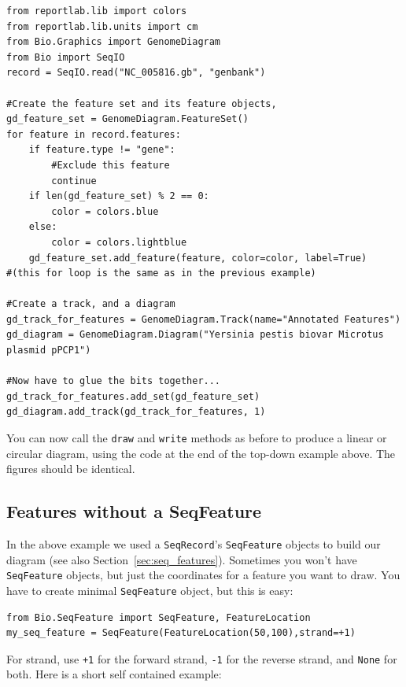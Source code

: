 \documentclass{report}
\begin{document}
\begin{verbatim}
from reportlab.lib import colors
from reportlab.lib.units import cm
from Bio.Graphics import GenomeDiagram
from Bio import SeqIO
record = SeqIO.read("NC_005816.gb", "genbank")

#Create the feature set and its feature objects,
gd_feature_set = GenomeDiagram.FeatureSet()
for feature in record.features:
    if feature.type != "gene":
        #Exclude this feature
        continue
    if len(gd_feature_set) % 2 == 0:
        color = colors.blue
    else:
        color = colors.lightblue
    gd_feature_set.add_feature(feature, color=color, label=True)
#(this for loop is the same as in the previous example)

#Create a track, and a diagram
gd_track_for_features = GenomeDiagram.Track(name="Annotated Features")
gd_diagram = GenomeDiagram.Diagram("Yersinia pestis biovar Microtus plasmid pPCP1")

#Now have to glue the bits together...
gd_track_for_features.add_set(gd_feature_set)
gd_diagram.add_track(gd_track_for_features, 1)
\end{verbatim}

You can now call the \verb|draw| and \verb|write| methods as before to produce
a linear or circular diagram, using the code at the end of the top-down example
above.  The figures should be identical.

\subsection{Features without a SeqFeature}
\label{sec:gd_features_without_seqfeatures}

In the above example we used a \verb|SeqRecord|'s \verb|SeqFeature| objects
to build our diagram (see also Section~\ref{sec:seq_features}).
Sometimes you won't have \verb|SeqFeature| objects,
but just the coordinates for a feature you want to draw.  You have to create
minimal \verb|SeqFeature| object, but this is easy:

\begin{verbatim}
from Bio.SeqFeature import SeqFeature, FeatureLocation
my_seq_feature = SeqFeature(FeatureLocation(50,100),strand=+1)
\end{verbatim}

For strand, use \texttt{+1} for the forward strand, \texttt{-1} for the
reverse strand, and \texttt{None} for both.  Here is a short self contained
example:
\end{document}
